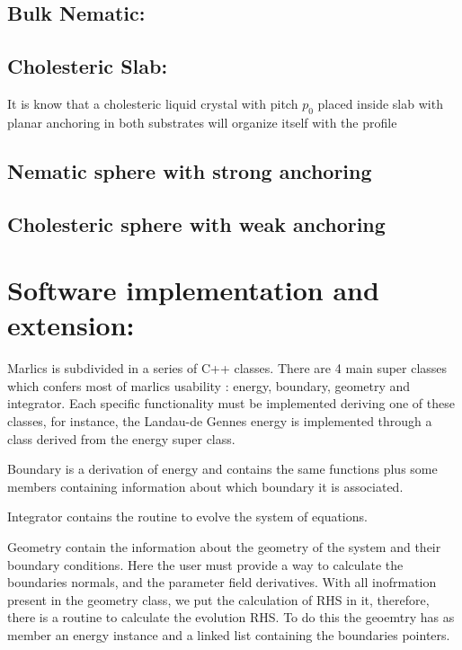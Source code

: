 \documentclass[final,5p,times,twocolumn]{elsarticle}
\begin{document}
\subsection{Bulk Nematic:}



\subsection{Cholesteric Slab:}

It is know that a cholesteric liquid crystal with pitch $p_0$ placed
inside slab with planar anchoring in both substrates will organize
itself with the profile 

\subsection{Nematic sphere with strong anchoring}


\subsection{Cholesteric sphere with weak anchoring}



\section{Software implementation and extension:}

Marlics is subdivided in a series of C++ classes. There are 4 main
super classes which confers most of marlics usability : energy,
boundary, geometry and integrator. Each specific functionality must be
implemented deriving one of these classes, for instance, the Landau-de
Gennes energy is implemented through a class derived from the energy
super class. 

Boundary is a derivation of energy and contains the same functions
plus some members containing information about which boundary it is
associated.

Integrator contains the routine to evolve the system of equations.

Geometry contain the information about the geometry of the system and
their boundary conditions. Here the user must provide a way to
calculate the boundaries normals, and the parameter field
derivatives. With all inofrmation present in the geometry class, we
put the calculation of RHS in it, therefore, there is a routine to
calculate the evolution RHS. To do this the geoemtry has as member an
energy instance and a linked list containing the boundaries pointers.
\end{document}
